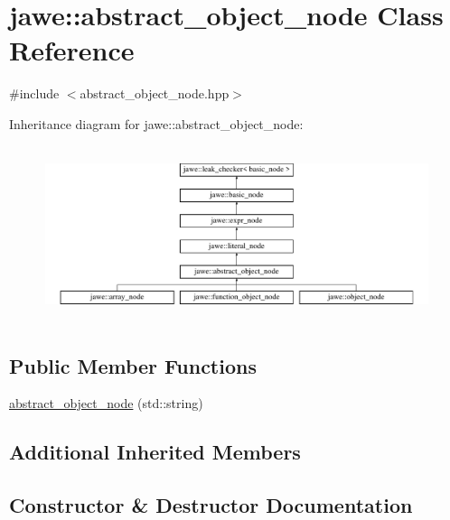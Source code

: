 \hypertarget{classjawe_1_1abstract__object__node}{}\section{jawe\+:\+:abstract\+\_\+object\+\_\+node Class Reference}
\label{classjawe_1_1abstract__object__node}


{\ttfamily \#include $<$abstract\+\_\+object\+\_\+node.\+hpp$>$}

Inheritance diagram for jawe\+:\+:abstract\+\_\+object\+\_\+node\+:\begin{figure}[H]
\begin{center}
\leavevmode
\includegraphics[height=5.161290cm]{classjawe_1_1abstract__object__node}
\end{center}
\end{figure}
\subsection*{Public Member Functions}
\begin{DoxyCompactItemize}
\item 
\hyperlink{classjawe_1_1abstract__object__node_a8450ead69438d87fbb72207407323da3}{abstract\+\_\+object\+\_\+node} (std\+::string)
\end{DoxyCompactItemize}
\subsection*{Additional Inherited Members}


\subsection{Constructor \& Destructor Documentation}
\mbox{\label{classjawe_1_1abstract__object__node_a8450ead69438d87fbb72207407323da3}} 
